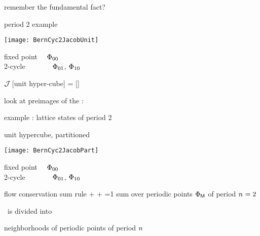 \begin{frame}{remember the fundamental fact?}
    \begin{block}{period 2 example}
\begin{center}
            \begin{minipage}[c]{0.32\textwidth}\begin{center}
\texttt{[image: BernCyc2JacobUnit]}
            \end{center}\end{minipage}
            \hspace{2ex}
            \begin{minipage}[c]{0.46\textwidth}
fixed point ~~$\Phi_{00}$\\
2-cycle ~~~~~~~$\Phi_{01}$, $\Phi_{10}$
            \end{minipage}
\end{center}
    \end{block}
\bigskip

${\cal J}\,$[unit hyper-cube] = [{\fundPip}]
\bigskip

look at preimages of the {\fundPip} :
\end{frame} %

\begin{frame}{example : lattice states of period 2}
    \begin{block}{unit hypercube, partitioned}
\begin{center}
            \begin{minipage}[c]{0.32\textwidth}\begin{center}
\texttt{[image: BernCyc2JacobPart]}
            \end{center}\end{minipage}
            \hspace{2ex}
            \begin{minipage}[c]{0.46\textwidth}
fixed point ~~$\Phi_{00}$\\
2-cycle ~~~~~~~$\Phi_{01}$, $\Phi_{10}$
            \end{minipage}
\end{center}
    \end{block}
\medskip

\begin{block}{
 {flow
conservation} sum rule
            }
\beq
   +    
   + 
    =1
\eeq
    {\footnotesize
sum over periodic points $\Phi_{\mathsf{M}}$ of period ${n_{}}=2$
    }
\end{block}

\statesp\ is divided into

\hfill
{\color{blue}neighborhoods} of periodic points of period ${n_{}}$
\end{frame} %

